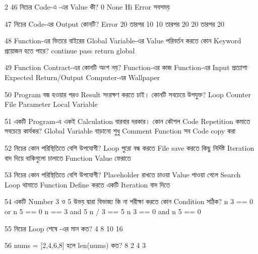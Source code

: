 \begin{multicols}{2}
\mcqwide
{46}
{নিচের Code-এ -এর Value কী?}
{0}
{None}
{Hi}
{Error সবসময়}

\mcqwide
{47}
{নিচের Code-এর Output কোনটি?}
{Error}
{20 তারপর 10}
{10 তারপর 20}
{20 তারপর 20}

\mcq
{48}
{Function-এর ভিতরে বাইরের Global Variable-এর Value পরিবর্তন করতে কোন Keyword প্রয়োজন হতে পারে?}
{continue}
{pass}
{return}
{global}

\mcqwide
{49}
{Function Contract-এর কোনটি অংশ নয়?}
{Function-এর কাজ}
{Function-এর Input প্রত্যাশা}
{Expected Return/Output}
{Computer-এর Wallpaper}

\mcq
{50}
{Program বন্ধ হওয়ার পরও Result সংরক্ষণ করতে চাই। কোনটি সবচেয়ে উপযুক্ত?}
{Loop Counter}
{File}
{Parameter}
{Local Variable}

\mcq
{51}
{একটি Program-এ একই Calculation বারবার দরকার। কোন কৌশল Code Repetition কমাতে সবচেয়ে কার্যকর?}
{Global Variable বাড়ানো}
{শুধু Comment}
{Function}
{সব Code copy করা}

\mcqwide
{52}
{নিচের কোন পরিস্থিতিতে  বেশি উপযোগী?}
{Loop পুরো বন্ধ করতে}
{File save করতে}
{কিছু নির্দিষ্ট Iteration বাদ দিয়ে বাকিগুলো চালাতে}
{Function Value ফেরাতে}

\mcqwide
{53}
{নিচের কোন পরিস্থিতিতে  বেশি উপযোগী?}
{Placeholder রাখতে}
{চাওয়া Value পাওয়া গেলে Search Loop থামাতে}
{Function Define করতে}
{একটি Iteration বাদ দিতে}

\mcq
{54}
{একটি Number 3 ও 5 উভয় দ্বারা বিভাজ্য কি না পরীক্ষা করতে কোন Condition সঠিক?}
{n  3 == 0 or n  5 == 0}
{n == 3 and 5}
{n / 3 == 5}
{n  3 == 0 and n  5 == 0}

\mcqwide
{55}
{নিচের Loop শেষে -এর মান কত?}
{4}
{8}
{10}
{16}

\mcqwide
{56}
{\textenglish{\ttfamily nums = [2,4,6,8]} হলে \textenglish{\ttfamily len(nums)} কত?}
{8}
{2}
{4}
{3}


\end{multicols}
